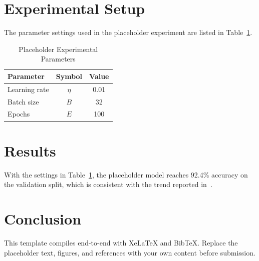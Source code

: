 \documentclass[conference]{IEEEtran}
\begin{document}
\section{Experimental Setup}
The parameter settings used in the placeholder experiment are listed in
Table~\ref{tab:params}.

\begin{table}[h]
  \renewcommand{\arraystretch}{1.2}
  \caption{Placeholder Experimental Parameters}
  \label{tab:params}
  \centering
  \begin{tabular}{lcc}
    \toprule
    Parameter & Symbol & Value \\
    \midrule
    Learning rate & $\eta$ & 0.01 \\
    Batch size    & $B$    & 32   \\
    Epochs        & $E$    & 100  \\
    \bottomrule
  \end{tabular}
\end{table}

\section{Results}
With the settings in Table~\ref{tab:params}, the placeholder model reaches 92.4\%
accuracy on the validation split, which is consistent with the trend reported
in~\cite{he2016resnet}.

\section{Conclusion}
This template compiles end-to-end with XeLaTeX and BibTeX. Replace the placeholder
text, figures, and references with your own content before submission.



\end{document}
